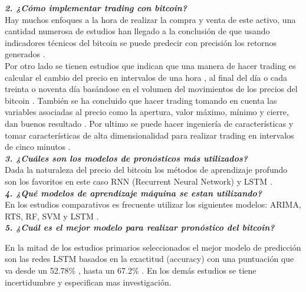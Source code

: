 \textbf{\textit{2. ¿Cómo implementar trading con bitcoin?}}\\
Hay muchos enfoques a la hora de realizar la compra y venta de este activo, una cantidad numerosa de estudios han llegado a la conclusión de que usando indicadores técnicos del bitcoin se puede predecir con precisión los retornos generados \cite{mudassirTimeseriesForecastingBitcoin2020}.\\
Por otro lado se tienen estudios que indican que una manera de hacer trading es calcular el cambio del precio en intervalos de una hora \cite{phaladisailoedMachineLearningModels2018}, al final del día o cada treinta o noventa día basándose en el volumen del movimientos de los precios del bitcoin \cite{mudassirTimeseriesForecastingBitcoin2020}. También se ha concluido que hacer trading tomando en cuenta las variables asociadas al precio como la apertura, valor máximo, mínimo y cierre, dan buenos resultado \cite{felizardoComparativeStudyBitcoin2019,phaladisailoedMachineLearningModels2018}. Por ultimo se puede hacer ingeniería de características y tomar características de alta dimensionalidad para realizar trading en intervalos de cinco minutos \cite{chenBitcoinPricePrediction2020} .\\

\textbf{\textit{3. ¿Cuáles son los modelos de pronósticos más utilizados?}}\\
Dada la naturaleza del precio del bitcoin los métodos de aprendizaje profundo son los favoritos en este caso RNN (Recurrent Neural Network) y LSTM \cite{mcnallyPredictingPriceBitcoin2018}.\\

\textbf{\textit{4. ¿Qué modelos de aprendizaje máquina se estan utilizando?}}\\
En los estudios comparativos es frecuente utilizar los siguientes modelos: ARIMA, RTS, RF, SVM y LSTM \cite{felizardoComparativeStudyBitcoin2019,phaladisailoedMachineLearningModels2018}.\\

\textbf{\textit{5. ¿Cuál es el mejor modelo para realizar pronóstico del bitcoin?}}

En la mitad de los estudios primarios seleccionados \cite{mudassirTimeseriesForecastingBitcoin2020,chenBitcoinPricePrediction2020,mcnallyPredictingPriceBitcoin2018} el mejor modelo de predicción son las redes LSTM basados en la exactitud (accuracy) con una puntuación que va desde un 52.78\% \cite{mcnallyPredictingPriceBitcoin2018}, hasta un 67.2\% \cite{chenBitcoinPricePrediction2020}. En los demás estudios se tiene incertidumbre y especifican mas investigación.

